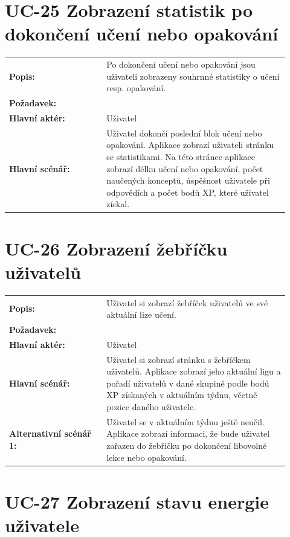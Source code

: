 \section{UC-25 Zobrazení statistik po dokončení učení nebo opakování}\label{sec:uc-25}

\begin{tabular}{p{0.32\linewidth}p{0.6\linewidth}}
  \textbf{Popis:} & Po dokončení učení nebo opakování jsou uživateli zobrazeny souhrnné statistiky o učení resp. opakování. \\
  \textbf{Požadavek:} & \nameref{sec:fp-learning-stats} \\
  \textbf{Hlavní aktér:} & Uživatel \\
  \textbf{Hlavní scénář:} & Uživatel dokončí poslední blok učení nebo opakování. Aplikace zobrazí uživateli stránku se statistikami. Na této stránce aplikace zobrazí délku učení nebo opakování, počet naučených konceptů, úspěšnost uživatele při odpovědích a počet bodů XP, které uživatel získal. \\
\end{tabular}


\section{UC-26 Zobrazení žebříčku uživatelů}\label{sec:uc-26}

\begin{tabular}{p{0.32\linewidth}p{0.6\linewidth}}
  \textbf{Popis:} & Uživatel si zobrazí žebříček uživatelů ve své aktuální lize učení. \\
  \textbf{Požadavek:} & \nameref{sec:fp-leaderboard} \\
  \textbf{Hlavní aktér:} & Uživatel \\
  \textbf{Hlavní scénář:} & Uživatel si zobrazí stránku s žebříčkem uživatelů. Aplikace zobrazí jeho aktuální ligu a pořadí uživatelů v dané skupině podle bodů XP získaných v aktuálním týdnu, včetně pozice daného uživatele. \\
  \textbf{Alternativní scénář 1:} & Uživatel se v aktuálním týdnu ještě neučil. Aplikace zobrazí informaci, že bude uživatel zařazen do žebříčku po dokončení libovolné lekce nebo opakování. \\
\end{tabular}

\section{UC-27 Zobrazení stavu energie uživatele}\label{sec:uc-27}


